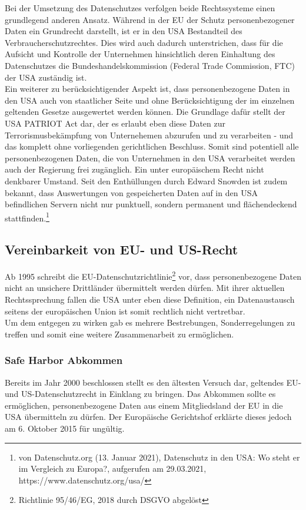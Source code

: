     Bei der Umsetzung des Datenschutzes verfolgen beide Rechtssysteme einen grundlegend anderen Ansatz. Während in der EU der Schutz personenbezogener Daten ein Grundrecht darstellt, ist er in den USA Bestandteil des Verbraucherschutzrechtes. Dies wird auch dadurch unterstrichen, dass für die Aufsicht und Kontrolle der Unternehmen hinsichtlich deren Einhaltung des Datenschutzes die Bundeshandelskommission (Federal Trade Commission, FTC) der USA zuständig ist.\\
    Ein weiterer zu berücksichtigender Aspekt ist, dass personenbezogene Daten in den USA auch von staatlicher Seite und ohne Berücksichtigung der im einzelnen geltenden Gesetze ausgewertet werden können. Die Grundlage dafür stellt der \glqq USA PATRIOT Act\grqq{} dar, der es erlaubt eben diese Daten zur Terrorismusbekämpfung von Unternehemen abzurufen und zu verarbeiten - und das komplett ohne vorliegenden gerichtlichen Beschluss. Somit sind potentiell alle personenbezogenen Daten, die von Unternehmen in den USA verarbeitet werden auch der Regierung frei zugänglich. Ein unter europäischem Recht nicht denkbarer Umstand. Seit den Enthüllungen durch Edward Snowden ist zudem bekannt, dass Auswertungen von gespeicherten Daten auf in den USA befindlichen Servern nicht nur punktuell, sondern permanent und flächendeckend stattfinden.\footnote{von Datenschutz.org (13. Januar 2021), Datenschutz in den USA: Wo steht er im Vergleich zu Europa?, aufgerufen am 29.03.2021, https://www.datenschutz.org/usa/}
\subsection{Vereinbarkeit von EU- und US-Recht}
    Ab 1995 schreibt die EU-Datenschutzrichtlinie\footnote{Richtlinie 95/46/EG, 2018 durch DSGVO abgelöst} vor, dass personenbezogene Daten nicht an unsichere Drittländer übermittelt werden dürfen. Mit ihrer aktuellen Rechtssprechung fallen die USA unter eben diese Definition, ein Datenaustausch seitens der europäischen Union ist somit rechtlich nicht vertretbar.\\
    Um dem entgegen zu wirken gab es mehrere Bestrebungen, Sonderregelungen zu treffen und somit eine weitere Zusammenarbeit zu ermöglichen.\\

\subsubsection{Safe Harbor Abkommen}
    Bereits im Jahr 2000 beschlossen stellt es den ältesten Versuch dar, geltendes EU- und US-Datenschutzrecht in Einklang zu bringen. Das Abkommen sollte es ermöglichen, personenbezogene Daten aus einem Mitgliedsland der EU in die USA übermitteln zu dürfen. Der Europäische Gerichtshof erklärte dieses jedoch am 6. Oktober 2015 für ungültig.\\

